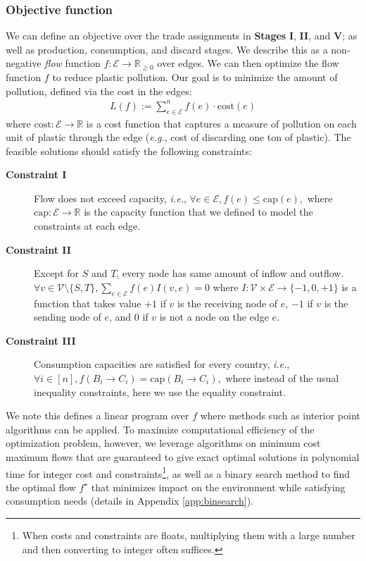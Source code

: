 \subsubsection{Objective function}
We can define an objective over the trade assignments in \textbf{Stages} \textbf{I}, \textbf{II}, and \textbf{V}; as well as production, consumption, and discard stages. We describe this as a non-negative \textit{flow} function $f: \mathcal{E} \to \mathbb{R}_{\geq 0}$ over edges.
We can then optimize the flow function $f$ to reduce plastic pollution. Our goal is to minimize the amount of pollution, defined via the cost in the edges:
\begin{align}
    L(f) := \sum_{e \in \mathcal{E}}^{n} f(e) \cdot \mathrm{cost}(e)
\end{align}
where $\mathrm{cost}: \mathcal{E} \to \mathbb{R}$ is a cost function that captures a measure of pollution on each unit of plastic through the edge (\textit{e.g.}, cost of discarding one ton of plastic). The feasible solutions should satisfy the following constraints:
\begin{description}
\item[\textbf{Constraint I}] Flow does not exceed capacity, \textit{i.e.},
    $
    \forall e \in \mathcal{E}, f(e) \leq \mathrm{cap}(e),
    $
    where $\mathrm{cap}: \mathcal{E} \to \mathbb{R}$ is the capacity function that we defined to model the constraints at each edge.
    \item[\textbf{Constraint II}] Except for $S$ and $T$, every node has same amount of inflow and outflow.
    $
    \forall v \in \mathcal{V} \setminus \{S, T\}, \sum_{e \in \mathcal{E}} f(e) I(v, e) = 0
    $
    where $I: \mathcal{V} \times \mathcal{E} \to \{-1, 0, +1\}$ is a function that takes value $+1$ if $v$ is the receiving node of $e$, $-1$ if $v$ is the sending node of $e$, and $0$ if $v$ is not a node on the edge $e$.
    \item[\textbf{Constraint III}] Consumption capacities are satisfied for every country, \textit{i.e.},
    $
    \forall i \in [n], f(B_i \to C_i) = \mathrm{cap}(B_i \to C_i),
    $
    where instead of the usual inequality constraints, here we use the equality constraint.
\end{description}
We note this defines a linear program over $f$ where methods such as interior point algorithms can be applied. To maximize computational efficiency of the optimization problem, however, we leverage algorithms on minimum cost maximum flows that are guaranteed to give exact optimal solutions in polynomial time for integer cost and constraints\footnote{When costs and constraints are floats, multiplying them with a large number and then converting to integer often suffices.}, as well as a binary search method to find the optimal flow $f^\star$ that minimizes impact on the environment while satisfying consumption needs (details in Appendix \ref{app:binsearch}).

